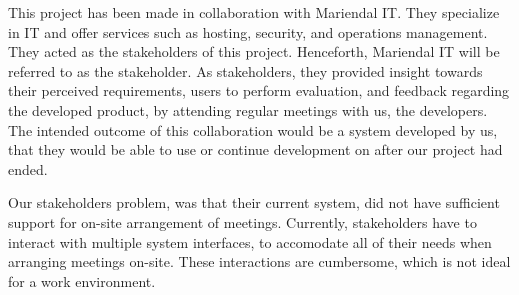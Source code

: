 This project has been made in collaboration with Mariendal IT.
They specialize in IT and offer services such as hosting, security, and operations management\cite{Mariendal_OmOs}.
They acted as the stakeholders of this project.
Henceforth, Mariendal IT will be referred to as the stakeholder. 
As stakeholders, they provided insight towards their perceived requirements, users to perform evaluation, and feedback regarding the developed product, by attending regular meetings with us, the developers.
The intended outcome of this collaboration would be a system developed by us, that they would be able to use or continue development on after our project had ended.




Our stakeholders problem, was that their current system, did not have sufficient support for on-site arrangement of meetings.
Currently, stakeholders have to interact with multiple system interfaces, to accomodate all of their needs when arranging meetings on-site. 
These interactions are cumbersome, which is not ideal for a work environment.
